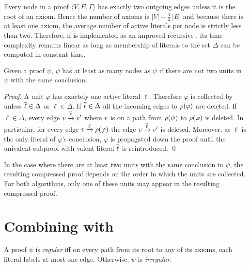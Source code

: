 \documentclass{llncs}
\begin{document}
Every node in a proof $\langle V, E, \Gamma \rangle$ has exactly two outgoing edges unless it is the
root of an axiom. Hence the number of axioms is $|V| - \frac{1}{2}\,|E|$ and because there is at
least one axiom, the average number of active literals per node is strictly less than two.
Therefore, if {\LowerUnivalents} is implemented as an improved recursive , its time
complexity remains linear as long as membership of literals to the set $\Delta$ can be computed in
constant time.

\begin{proposition} \label{prop:compression}
Given a proof $\psi$,
{\LowerUnits\FuncSty{(}$\psi$\FuncSty{)}}
has at least as many nodes as 
{\LowerUnivalents\FuncSty{(}$\psi$\FuncSty{)}}
if there are not two units in $\psi$ with the same conclusion.
\end{proposition}

\begin{proof}
A unit $\varphi$ has exactely one active literal $\ell$. Therefore $\varphi$ is collected by
{\LowerUnivalents} unless $\overline{\ell} \in \Delta$ or $\ell \in \Delta$. If $\overline{\ell} \in \Delta$
all the incoming edges to $\rho(\varphi)$ are deleted. If $\ell \in \Delta$, every edge
$v \xrightarrow{\overline{\ell}} v'$ where $v$ is on a path from $\rho(\psi)$ to $\rho(\varphi)$
is deleted.
In particular, for every edge $v \xrightarrow{\ell} \rho(\varphi)$ the edge $v
\xrightarrow{\overline{\ell}} v'$ is deleted.  Moreover, as $\ell$ is the only literal of $\varphi$'s
conclusion, $\varphi$ is propagated down the proof until the univalent subproof with valent literal
$\overline{\ell}$ is reintroduced. \qed
\end{proof}

In the case where there are at least two units with the same conclusion in $\psi$, the resulting
compressed proof depends on the order in which the units are collected. For both algorithms, only one of these
units may appear in the resulting compressed proof.



\section{Combining {\LowerUnivalents} with {\RPI}} \label{sec:LUnivRPI}

\begin{definition}
A proof $\psi$ is \emph{regular} iff on every path from its root to any of its axioms, each literal
labels at most one edge. Otherwise, $\psi$ is \emph{irregular}.
\end{definition}
\end{document}
